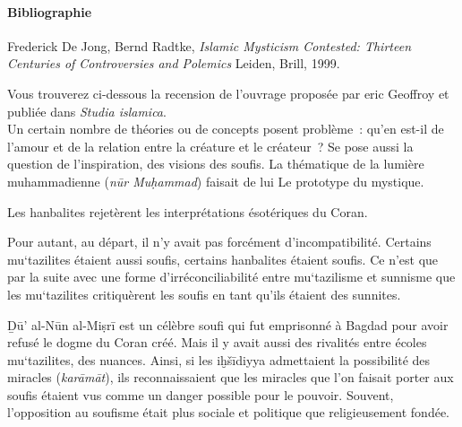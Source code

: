 


\paragraph{Bibliographie}

Frederick De Jong, Bernd Radtke, \emph{Islamic Mysticism Contested:
Thirteen Centuries of Controversies and Polemics} Leiden, Brill, 1999.

Vous trouverez ci-dessous la recension de l'ouvrage proposée par eric
Geoffroy et publiée dans \emph{Studia islamica}. \\


Un certain nombre de théories ou de concepts posent problème~: qu'en
est-il de l'amour et de la relation entre la créature et le créateur~?
Se pose aussi la question de l'inspiration, des visions des soufis. La
thématique de la lumière muhammadienne (\emph{nūr Muḥammad}) faisait de
lui Le prototype du mystique.

Les hanbalites rejetèrent les interprétations ésotériques du Coran.

Pour autant, au départ, il n'y avait pas forcément d'incompatibilité.
Certains mu`tazilites étaient aussi soufis, certains hanbalites étaient
soufis. Ce n'est que par la suite avec une forme d'irréconciliabilité
entre mu`tazilisme et sunnisme que les mu`tazilites critiquèrent les
soufis en tant qu'ils étaient des sunnites.

Ḏū' al-Nūn al-Miṣrī est un célèbre soufi qui fut emprisonné à Bagdad
pour avoir refusé le dogme du Coran créé. Mais il y avait aussi des
rivalités entre écoles mu`tazilites, des nuances. Ainsi, si les
iḫšīdiyya admettaient la possibilité des miracles (\emph{karāmāt}), ils
reconnaissaient que les miracles que l'on faisait porter aux soufis
étaient vus comme un danger possible pour le pouvoir. Souvent,
l'opposition au soufisme était plus sociale et politique que
religieusement fondée.

